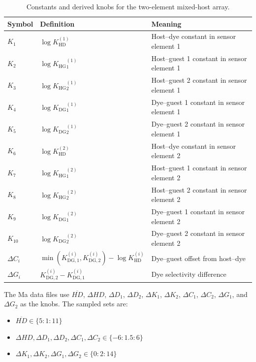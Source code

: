 \documentclass[11pt]{article}
\newcommand{\KHD}{K_{\mathrm{HD}}}
\newcommand{\KHG}{K_{\mathrm{HG}}}
\newcommand{\KDG}{K_{\mathrm{DG}}}
\begin{document}
\begin{table}[H]
\centering
\caption{Constants and derived knobs for the two-element mixed-host array.}
\label{tab:ma_constants}
\small
\renewcommand{\arraystretch}{1.12}
\begin{tabular}{lll}
\toprule
Symbol & Definition & Meaning \\
\midrule
$K_1$ & $\log \KHD^{(1)}$ & Host--dye constant in sensor element 1 \\
$K_2$ & $\log \KHG{}_{1}^{(1)}$ & Host--guest 1 constant in sensor element 1 \\
$K_3$ & $\log \KHG{}_{2}^{(1)}$ & Host--guest 2 constant in sensor element 1 \\
$K_4$ & $\log \KDG{}_{1}^{(1)}$ & Dye--guest 1 constant in sensor element 1 \\
$K_5$ & $\log \KDG{}_{2}^{(1)}$ & Dye--guest 2 constant in sensor element 1 \\
$K_6$ & $\log \KHD^{(2)}$ & Host--dye constant in sensor element 2 \\
$K_7$ & $\log \KHG{}_{1}^{(2)}$ & Host--guest 1 constant in sensor element 2 \\
$K_8$ & $\log \KHG{}_{2}^{(2)}$ & Host--guest 2 constant in sensor element 2 \\
$K_9$ & $\log \KDG{}_{1}^{(2)}$ & Dye--guest 1 constant in sensor element 2 \\
$K_{10}$ & $\log \KDG{}_{2}^{(2)}$ & Dye--guest 2 constant in sensor element 2 \\
$\Delta C_i$ & $\min(K_{\mathrm{DG},1}^{(i)},K_{\mathrm{DG},2}^{(i)})-\log\KHD^{(i)}$ & Dye--guest offset from host--dye \\
$\Delta G_i$ & $K_{\mathrm{DG},2}^{(i)}-K_{\mathrm{DG},1}^{(i)}$ & Dye selectivity difference \\
\bottomrule
\end{tabular}
\end{table}

The Ma data files use $\overline{HD}$, $\Delta HD$, $\Delta D_1$, $\Delta D_2$,
$\Delta K_1$, $\Delta K_2$, $\Delta C_1$, $\Delta C_2$, $\Delta G_1$, and
$\Delta G_2$ as the knobs. The sampled sets are:
\begin{itemize}
    \item $\overline{HD} \in \{5:1:11\}$
    \item $\Delta HD,\Delta D_1,\Delta D_2,\Delta C_1,\Delta C_2 \in \{-6:1.5:6\}$
    \item $\Delta K_1,\Delta K_2,\Delta G_1,\Delta G_2 \in \{0:2:14\}$
\end{itemize}
\end{document}
